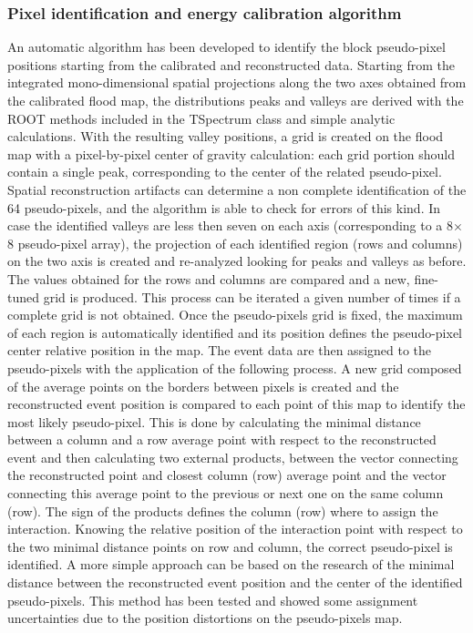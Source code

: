 \subsubsection{Pixel identification and energy calibration algorithm}\label{chap3::subsubsec::absPixel_ID_algo}
An automatic algorithm has been developed to identify the block pseudo-pixel positions starting from the calibrated and reconstructed data. Starting from the integrated mono-dimensional spatial projections along the two axes obtained from the calibrated flood map, the distributions peaks and valleys are derived with the ROOT methods included in the TSpectrum class and simple analytic calculations. With the resulting valley positions, a grid is created on the flood map with a pixel-by-pixel center of gravity calculation: each grid portion should contain a single peak, corresponding to the center of the related pseudo-pixel. Spatial reconstruction artifacts can determine a non complete identification of the 64 pseudo-pixels, and the algorithm is able to check for errors of this kind. In case the identified valleys are less then seven on each axis (corresponding to a 8$\times$8 pseudo-pixel array), the projection of each identified region (rows and columns) on the two axis is created and re-analyzed looking for peaks and valleys as before. The values obtained for the rows and columns are compared and a new, fine-tuned grid is produced. This process can be iterated a given number of times if a complete grid is not obtained. Once the pseudo-pixels grid is fixed, the maximum of each region is automatically identified and its position defines the pseudo-pixel center relative position in the map. The event data are then assigned to the pseudo-pixels with the application of the following process. A new grid composed of the average points on the borders between pixels is created and the reconstructed event position is compared to each point of this map to identify the most likely pseudo-pixel. This is done by calculating the minimal distance between a column and a row average point with respect to the reconstructed event and then calculating two external products, between the vector connecting the reconstructed point and closest column (row) average point and the vector connecting this average point to the previous or next one on the same column (row). The sign of the products defines the column (row) where to assign the interaction. 
Knowing the relative position of the interaction point with respect to the two minimal distance points on row and column, the correct pseudo-pixel is identified.    
A more simple approach can be based on the research of the minimal distance between the reconstructed event position and the center of the identified pseudo-pixels. This method has been tested and showed some assignment uncertainties due to the position distortions on the pseudo-pixels map. 


